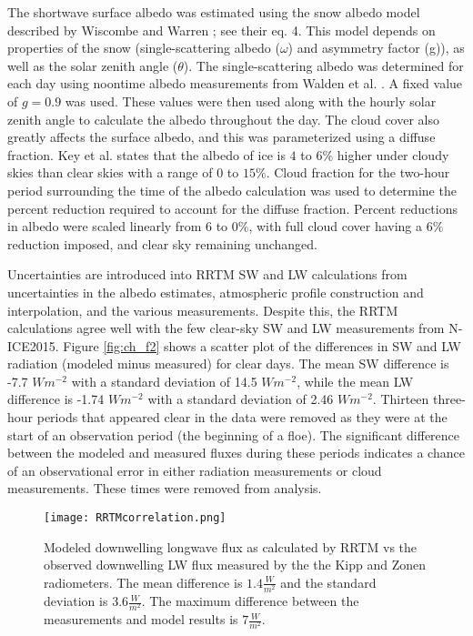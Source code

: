 The shortwave surface albedo was estimated using the snow albedo model described by Wiscombe and Warren \cite{wiscombe:1980}; see their eq. 4. This model depends on properties of the snow (single-scattering albedo ($\omega$) and asymmetry factor (g)), as well as the solar zenith angle ($\theta$). The single-scattering albedo was determined for each day using noontime albedo measurements from Walden et al. \cite{walden:2017}. A fixed value of $g = 0.9$ was used. These values were then used along with the hourly solar zenith angle to calculate the albedo throughout the day. The cloud cover also greatly affects the surface albedo, and this was parameterized using a diffuse fraction. Key et al. \cite{key:2001} states that the albedo of ice is $4$ to $6 \%$ higher under cloudy skies than clear skies with a range of $0$ to $15 \%$. Cloud fraction for the two-hour period surrounding the time of the albedo calculation was used to determine the percent reduction required to account for the diffuse fraction. Percent reductions in albedo were scaled linearly from $6$ to $0 \%$, with full cloud cover having a $6 \%$ reduction imposed, and clear sky remaining unchanged.

Uncertainties are introduced into RRTM SW and LW calculations from uncertainties in the albedo estimates, atmospheric profile construction and interpolation, and the various measurements. Despite this, the RRTM calculations agree well with the few clear-sky SW and LW measurements from N-ICE2015. Figure \ref{fig:ch_f2} shows a scatter plot of the differences in SW and LW radiation (modeled minus measured) for clear days. The mean SW difference is -7.7 $W m^{-2}$ with a standard deviation of 14.5 $W m^{-2}$, while the mean LW difference is -1.74 $W m^{-2}$ with a standard deviation of 2.46 $W m^{-2}$. Thirteen three-hour periods that appeared clear in the data were removed as they were at the start of an observation period (the beginning of a floe). The significant difference between the modeled and measured fluxes during these periods indicates a chance of an observational error in either radiation measurements or cloud measurements. These times were removed from analysis.

\begin{figure}[H]
    \centering
    \texttt{[image: RRTMcorrelation.png]}
    \caption[RRTM modeled downwelling longwave flux vs measured flux.]{Modeled downwelling longwave flux as calculated by RRTM vs the observed downwelling LW flux measured by the the Kipp and Zonen radiometers. The mean difference is $1.4 \frac{W}{m^{2}}$ and the standard deviation is $3.6 \frac{W}{m^{2}}$. The maximum difference between the measurements and model results is $7 \frac{W}{m^{2}}$.}
    \label{fig:ch2_f2}
\end{figure}

